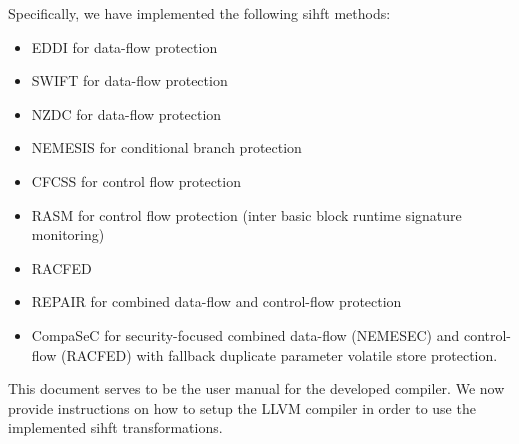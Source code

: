 \documentclass[12pt]{report}
\begin{document}
Specifically, we have implemented the following \ac{sihft} methods:
\begin{itemize}
 \item{EDDI \cite{eddi} for data-flow protection}
 \item{SWIFT \cite{swift} for data-flow protection}
 \item{NZDC \cite{nzdc} for data-flow protection}
 \item{NEMESIS \cite{nemesis} for conditional branch protection}
 \item{CFCSS \cite{cfcss} for control flow protection}
 \item{RASM \cite{rasm} for control flow protection (inter basic block runtime signature monitoring)}
 \item{RACFED \cite{racfed for control flow protection (inter and intra block runtime signature monitoring)}}
 \item{REPAIR \cite{repair} for combined data-flow and control-flow protection}
 \item{CompaSeC \cite{compasec} for security-focused combined data-flow (NEMESEC) and control-flow (RACFED) with fallback duplicate parameter volatile store protection.}
\end{itemize}

This document serves to be the user manual for the developed compiler. We now provide instructions on how to setup the
LLVM compiler in order to use the implemented \ac{sihft} transformations.

\newpage


\newpage




\end{document}
